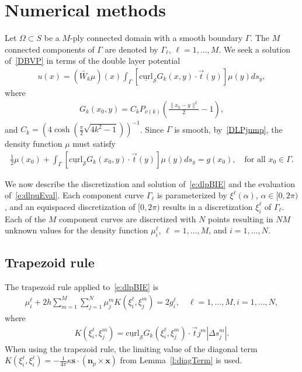\documentclass[final]{siamltex}
\newcommand{\C}{C_k}
\renewcommand{\S} {\mathcal{S}}
\begin{document}
\section{Numerical methods}
\label{s:numerics}
Let $\Omega \subset S$ be a $M$-ply connected domain with a smooth
boundary $\Gamma$.  The $M$ connected components of $\Gamma$ are denoted
by $\Gamma_{\ell}$, $\ell = 1,\dots,M$.  We seek a solution
of~\eqref{DBVP} in terms of the double layer potential 
\begin{align}
  \label{e:dlpuEval}
  u(x) = (\widetilde{W_k}\mu )(x)
  \int_{\Gamma} [\underline{\mbox{curl}}_{\S}G_{k}(x,y) 
    \cdot \vec{t}(y)] \mu(y)ds_{y},
\end{align}
where
\begin{align*}
  G_{k}(x_{0},y) = \C P_{\nu(k)} \left(
    \frac{\|x_{0} - y\|^{2}}{2} - 1\right),
\end{align*}
and $\C = (4\cosh(\frac{\pi}{2}\sqrt{4k^{2}-1}))^{-1}$.  Since $\Gamma$
is smooth, by~\eqref{DLPjump}, the density function $\mu$ must satisfy
\begin{align}
  \label{e:dlpBIE}
  \frac{1}{2}\mu(x_{0}) + \int_{\Gamma}
    [\underline{\mbox{curl}}_{\S}G_{k}(x_{0},y) \cdot
    \vec{t}(y)] \mu(y)ds_{y} = g(x_{0}), 
    \quad \mbox{for all } x_{0} \in \Gamma.
\end{align}

We now describe the discretization and solution of~\eqref{e:dlpBIE} and
the evaluation of~\eqref{e:dlpuEval}.  Each component curve
$\Gamma_{\ell}$ is parameterized by $\xi^{\ell}(\alpha)$, $\alpha \in
[0,2\pi)$, and an equispaced discretization of $[0,2\pi)$ results in a
discretization $\xi_{i}^{\ell}$ of $\Gamma_{\ell}$.  Each of the $M$
component curves are discretized with $N$ points resulting in $NM$
unknown values for the density function $\mu_{i}^{\ell}$, $\ell =
1,\ldots,M$, and $i = 1,\ldots,N$.

\subsection{Trapezoid rule}

The trapezoid rule applied to~\eqref{e:dlpBIE} is 
\begin{align}
  \label{e:trapRule}
  \mu_{i}^{\ell} + 2h \sum_{m=1}^{M} \sum_{j=1}^{N}
    \mu_{j}^{m} K(\xi_{i}^{\ell},\xi_{j}^{m}) = 2g_{i}^{\ell}, \quad
      \ell=1,\ldots,M,i=1,\ldots,N,
\end{align}
where
\begin{align*}
  K(\xi_{i}^{\ell},\xi_{j}^{m}) =\underline{\mbox{curl}}_{\S}G_{k}
    (\xi_{i}^{\ell},\xi_{j}^{m}) \cdot \vec{t}{j}^{m} |\Delta s_{j}^{m}|.
\end{align*}
When using the trapezoid rule, the limiting value of the diagonal term
$K(\xi_{i}^{\ell},\xi_{i}^{\ell}) = -\frac{1}{4\pi} \kappa
\mathbf{s}\cdot(\mathbf{n}_p\times \mathbf{x})$ from
Lemma~\ref{l:diagTerm} is used.
\end{document}
